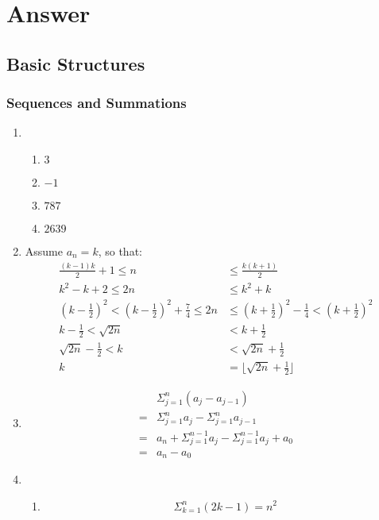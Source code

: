\documentclass{../../cls/sig-alternate-05-2015}
\begin{document}
\clearpage
\appendix
\section{Answer}
\subsection{Basic Structures}
\subsubsection{Sequences and Summations}
\begin{enumerate}
\item \begin{enumerate}
	\item $3$
	\item $-1$
	\item $787$
	\item $2639$
\end{enumerate}
	
\item Assume $a_n = k$, so that:
\begin{align}
	\frac{(k - 1)k}{2} + 1 \le n & \le \frac{k(k + 1)}{2}\\
	k^2 - k + 2 \le 2n & \le k^2 + k\\
	(k - \frac{1}{2})^2 < (k - \frac{1}{2})^2 + \frac{7}{4} \le 2n & \le (k + \frac{1}{2})^2 - \frac{1}{4} < (k + \frac{1}{2})^2\\
	k - \frac{1}{2} < \sqrt{2n} & < k + \frac{1}{2}\\
	\sqrt{2n} - \frac{1}{2} < k & < \sqrt{2n} + \frac{1}{2}\\
	k & = \lfloor \sqrt{2n} + \frac{1}{2} \rfloor
\end{align}

\item 
\begin{align}
	& \Sigma^n_{j = 1}(a_j - a_{j - 1})\\
	= & \Sigma^n_{j = 1}a_j - \Sigma^n_{j = 1}a_{j - 1}\\
	= & a_n + \Sigma^{n - 1}_{j = 1}a_j - \Sigma^{n - 1}_{j = 1}a_j + a_0\\
	= & a_n - a_0
\end{align}

\item 
\begin{enumerate}
	\item 
	\begin{equation}
		\Sigma^n_{k = 1}(2k - 1) = n^2
	\end{equation}
	

\end{enumerate}
\end{enumerate}
\end{document}
